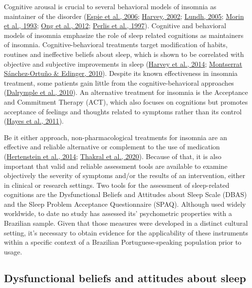 \documentclass[
  ,doc,11pt, twoside,floatsintext]{apa6}
\begin{document}
Cognitive arousal is crucial to several behavioral models of insomnia as maintainer of the disorder (\protect\hyperlink{ref-espie2006}{Espie et al., 2006}; \protect\hyperlink{ref-harvey2002}{Harvey, 2002}; \protect\hyperlink{ref-lundh2005}{Lundh, 2005}; \protect\hyperlink{ref-morin1993}{Morin et al., 1993}; \protect\hyperlink{ref-ong2012}{Ong et al., 2012}; \protect\hyperlink{ref-perlis1997}{Perlis et al., 1997}). Cognitive and behavioral models of insomnia emphasize the role of sleep related cognitions as maintainers of insomnia. Cognitive-behavioral treatments target modification of habits, routines and ineffective beliefs about sleep, which is shown to be correlated with objective and subjective improvements in sleep (\protect\hyperlink{ref-harvey2014}{Harvey et al., 2014}; \protect\hyperlink{ref-montserratsanchez-ortuno2010}{Montserrat Sánchez-Ortuño \& Edinger, 2010}). Despite its known effectiveness in insomnia treatment, some patients gain little from the cognitive-behavioral approaches (\protect\hyperlink{ref-dalrymple2010}{Dalrymple et al., 2010}). An alternative treatment for insomnia is the Acceptance and Commitment Therapy (ACT), which also focuses on cognitions but promotes acceptance of feelings and thoughts related to symptoms rather than its control (\protect\hyperlink{ref-hayes2011acceptance}{Hayes et al., 2011}).

Be it either approach, non-pharmacological treatments for insomnia are an effective and reliable alternative or complement to the use of medication (\protect\hyperlink{ref-hertenstein2014}{Hertenstein et al., 2014}; \protect\hyperlink{ref-thakral2020}{Thakral et al., 2020}). Because of that, it is also important that valid and reliable assessment tools are available to examine objectively the severity of symptoms and/or the results of an intervention, either in clinical or research settings. Two tools for the assessment of sleep-related cognitions are the Dysfunctional Beliefs and Attitudes about Sleep Scale (DBAS) and the Sleep Problem Acceptance Questionnaire (SPAQ). Although used widely worldwide, to date no study has assessed its' psychometric properties with a Brazilian sample. Given that those measures were developed in a distinct cultural setting, it's necessary to obtain evidence for the applicability of these instruments within a specific context of a Brazilian Portuguese-speaking population prior to usage.

\hypertarget{dysfunctional-beliefs-and-attitudes-about-sleep}{%
\subsection{Dysfunctional beliefs and attitudes about sleep}\label{dysfunctional-beliefs-and-attitudes-about-sleep}}
\end{document}

